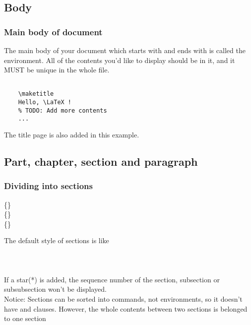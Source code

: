 \subsection{Body}
\begin{frame}[fragile]
	\frametitle{Main body of document}
	The main body of your document which starts with \LC{} and ends with \LC{} is called the  environment. All of the contents you'd like to display should be in it, and it \alert{MUST} be \alert{unique} in the whole file.
	\begin{example}
		\begin{verbatim}

    \maketitle
    Hello, \LaTeX !
    % TODO: Add more contents
    ...

		\end{verbatim}
	\end{example}
	The title page is also added in this example.
\end{frame}

\subsection{Part, chapter, section and paragraph}

\begin{frame}
	\frametitle{Dividing into sections}
	\begin{command}
		\{\}\\
		\{\}\\
		\{\}\\
	\end{command}
	The default style of sections is like\\
	\\
	\\
	\\[0.5em]
	If a star(\alert{*}) is added, the sequence number of the section, subsection or subsubsection won't be displayed.\\
	\alert{Notice:} Sections can be sorted into commands, not environments, so it doesn't have  and  clauses. However, the whole contents between two sections is belonged to one section
\end{frame}

